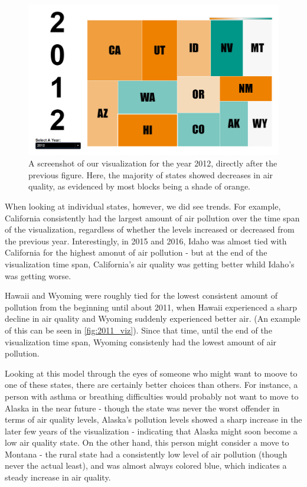 \documentclass[journal]{vgtc}                %
\begin{document}
\begin{figure}
   \includegraphics[width=\columnwidth]{2012_viz.png}
   \caption{A screenshot of our visualization for the year 2012, directly after the previous figure. Here, the majority of states
   showed decreases in air quality, as evidenced by most blocks being a shade of orange.\label{fig:2012_viz}}
\end{figure}

When looking at individual states, however, we did see trends. For example, California consistently had the largest amount of air
pollution over the time span of the visualization, regardless of whether the levels increased or decreased from the previous year.
Interestingly, in 2015 and 2016, Idaho was almost tied with California for the highest amonut of air pollution - but at the end
of the visualization time span, California's air quality was getting better whild Idaho's was getting worse.

Hawaii and Wyoming were roughly tied for the lowest consistent amount of pollution from the beginning until about 2011, when Hawaii
experienced a sharp decline in air quality and Wyoming suddenly experienced better air. (An example of this can be seen in \ref{fig:2011_viz}).
Since that time, until the end of the visualization time span, Wyoming consistenly had the lowest amount of air pollution. 

Looking at this model through the eyes of someone who might want to moove to one of these states, there are certainly better choices than 
others. For instance, a person with asthma or breathing difficulties would probably not want to move to Alaska in the near future - though
the state was never the worst offender in terms of air quality levels, Alaska's pollution levels showed a sharp increase in the later few
years of the visualization - indicating that Alaska might soon become a low air quality state. On the other hand, this person might consider
a move to Montana - the rural state had a consistently low level of air pollution (though never the actual least), and was almost always
colored blue, which indicates a steady increase in air quality.
\end{document}
